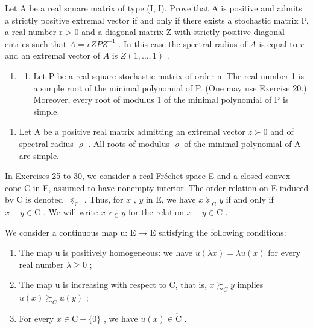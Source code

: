 Let A be a real square matrix of type (I, I). Prove that A is positive and admits a strictly positive extremal vector if and only if there exists a stochastic matrix P, a real number r \textgreater{} 0 and a diagonal matrix Z with strictly positive diagonal entries such that \(A = rZPZ^{-1}\) . In this case the spectral radius of \(A\) is equal to \(r\) and an extremal vector of \(A\) is \(Z(1, \ldots, 1)\) .

\begin{enumerate}
\def\labelenumi{\arabic{enumi})}
\setcounter{enumi}{23}
\tightlist
\item
  \begin{enumerate}
  \def\labelenumii{\alph{enumii})}
  \tightlist
  \item
    Let P be a real square stochastic matrix of order n. The real number 1 is a simple root of the minimal polynomial of P. (One may use Exercise 20.) Moreover, every root of modulus 1 of the minimal polynomial of P is simple.
  \end{enumerate}
\end{enumerate}

\begin{enumerate}
\def\labelenumi{\alph{enumi})}
\setcounter{enumi}{1}
\tightlist
\item
  Let A be a positive real matrix admitting an extremal vector \(z \succ 0\) and of spectral radius \(\varrho\) . All roots of modulus \(\varrho\) of the minimal polynomial of A are simple.
\end{enumerate}

In Exercises 25 to 30, we consider a real Fréchet space E and a closed convex cone C in E, assumed to have nonempty interior. The order relation on E induced by C is denoted \(\preccurlyeq_{\mathrm{C}}\) . Thus, for \(x\) , \(y\) in E, we have \(x \succcurlyeq_{\mathrm{C}} y\) if and only if \(x - y \in \mathrm{C}\) . We will write \(x \succ_{\mathrm{C}} y\) for the relation \(x - y \in \mathring{\mathrm{C}}\) .

We consider a continuous map u: E → E satisfying the following conditions:

\begin{enumerate}
\def\labelenumi{(\roman{enumi})}
\item
  The map u is positively homogeneous: we have \(u(\lambda x) = \lambda u(x)\) for every real number \(\lambda \geqslant 0\) ;
\item
  The map u is increasing with respect to C, that is, \(x \succsim_{C} y\) implies \(u(x) \succsim_{C} u(y)\) ;
\item
  For every \(x \in \mathrm{C} - \{0\}\) , we have \(u(x) \in \mathring{\mathrm{C}}\) .
\end{enumerate}

